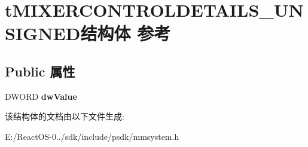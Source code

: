 \hypertarget{structt_m_i_x_e_r_c_o_n_t_r_o_l_d_e_t_a_i_l_s___u_n_s_i_g_n_e_d}{}\section{t\+M\+I\+X\+E\+R\+C\+O\+N\+T\+R\+O\+L\+D\+E\+T\+A\+I\+L\+S\+\_\+\+U\+N\+S\+I\+G\+N\+E\+D结构体 参考}
\label{structt_m_i_x_e_r_c_o_n_t_r_o_l_d_e_t_a_i_l_s___u_n_s_i_g_n_e_d}
\subsection*{Public 属性}
\begin{DoxyCompactItemize}
\item 
\mbox{\label{structt_m_i_x_e_r_c_o_n_t_r_o_l_d_e_t_a_i_l_s___u_n_s_i_g_n_e_d_ad92abd1c9dcb9510de8ccd43c63d8c10}} 
D\+W\+O\+RD {\bfseries dw\+Value}
\end{DoxyCompactItemize}


该结构体的文档由以下文件生成\+:\begin{DoxyCompactItemize}
\item 
E\+:/\+React\+O\+S-\/0../sdk/include/psdk/mmsystem.\+h\end{DoxyCompactItemize}
